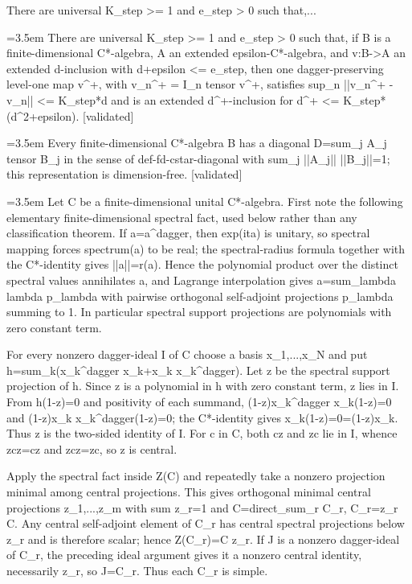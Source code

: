 \documentclass{article}
\newcommand{\step}[1]{\par\noindent\hangindent=3.5em\hangafter=1%
  \makebox[3.5em][l]{\textbf{#1.}}}
\newcommand{\steptag}[1]{\hfill{\small\textsf{[#1]}}}
\begin{document}
\begin{proofbox}{There are universal K\_step >= 1 and e\_step > 0 such that,...}
\step{1} There are universal K\_step >= 1 and e\_step > 0 such that, if B is a finite-dimensional C*-algebra, A an extended epsilon-C*-algebra, and v:B->A an extended d-inclusion with d+epsilon <= e\_step, then one dagger-preserving level-one map v\textasciicircum{}+, with v\_n\textasciicircum{}+ = I\_n tensor v\textasciicircum{}+, satisfies sup\_n ||v\_n\textasciicircum{}+ - v\_n|| <= K\_step*d and is an extended d\textasciicircum{}+-inclusion for d\textasciicircum{}+ <= K\_step*(d\textasciicircum{}2+epsilon). \steptag{validated} \\[6pt]
\step{1.1} Every finite-dimensional C*-algebra B has a diagonal D=sum\_j A\_j tensor B\_j in the sense of def-fd-cstar-diagonal with sum\_j ||A\_j|| ||B\_j||=1; this representation is dimension-free. \steptag{validated} \\[6pt]
\step{1.1.1} Let C be a finite-dimensional unital C*-algebra. First note the following elementary finite-dimensional spectral fact, used below rather than any classification theorem. If a=a\textasciicircum{}dagger, then exp(ita) is unitary, so spectral mapping forces spectrum(a) to be real; the spectral-radius formula together with the C*-identity gives ||a||=r(a). Hence the polynomial product over the distinct spectral values annihilates a, and Lagrange interpolation gives a=sum\_lambda lambda p\_lambda with pairwise orthogonal self-adjoint projections p\_lambda summing to 1. In particular spectral support projections are polynomials with zero constant term.

For every nonzero dagger-ideal I of C choose a basis x\_1,...,x\_N and put h=sum\_k(x\_k\textasciicircum{}dagger x\_k+x\_k x\_k\textasciicircum{}dagger). Let z be the spectral support projection of h. Since z is a polynomial in h with zero constant term, z lies in I. From h(1-z)=0 and positivity of each summand, (1-z)x\_k\textasciicircum{}dagger x\_k(1-z)=0 and (1-z)x\_k x\_k\textasciicircum{}dagger(1-z)=0; the C*-identity gives x\_k(1-z)=0=(1-z)x\_k. Thus z is the two-sided identity of I. For c in C, both cz and zc lie in I, whence zcz=cz and zcz=zc, so z is central.

Apply the spectral fact inside Z(C) and repeatedly take a nonzero projection minimal among central projections. This gives orthogonal minimal central projections z\_1,...,z\_m with sum z\_r=1 and C=direct\_sum\_r C\_r, C\_r=z\_r C. Any central self-adjoint element of C\_r has central spectral projections below z\_r and is therefore scalar; hence Z(C\_r)=C z\_r. If J is a nonzero dagger-ideal of C\_r, the preceding ideal argument gives it a nonzero central identity, necessarily z\_r, so J=C\_r. Thus each C\_r is simple.


\end{proofbox}
\end{document}
